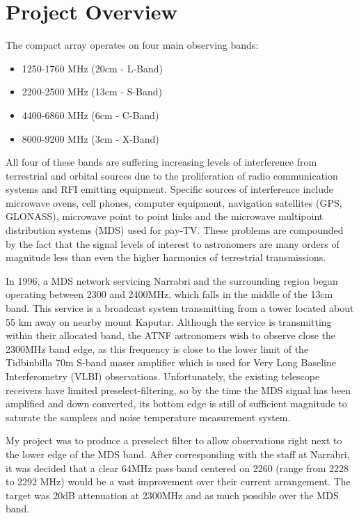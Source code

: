 \section{Project Overview}
The compact array operates on four main observing bands:

\begin{itemize}
\item	1250-1760 MHz (20cm - L-Band)
\item	2200-2500 MHz (13cm - S-Band)
\item	4400-6860 MHz (6cm  - C-Band)
\item	8000-9200 MHz (3cm  - X-Band)
\end{itemize}

All four of these bands are suffering increasing levels of interference from terrestrial and orbital sources due to the proliferation of radio communication systems and RFI emitting equipment. Specific sources of interference include microwave ovens, cell phones, computer equipment, navigation satellites (GPS, GLONASS), microwave point to point links and the microwave multipoint distribution systems (MDS) used for pay-TV. These problems are compounded by the fact that the signal levels of interest to astronomers are many orders of magnitude less than even the higher harmonics of terrestrial transmissions.

In 1996, a MDS network servicing Narrabri and the surrounding region began operating between 2300 and 2400MHz, which falls in the middle of the 13cm band. This service is a broadcast system transmitting from a tower located about 55 km away on nearby mount Kaputar. Although the service is transmitting within their allocated band, the ATNF astronomers wish to observe close the 2300MHz band edge, as this frequency is close to the lower limit of the Tidbinbilla 70m S-band maser amplifier which is used for Very Long Baseline Interferometry (VLBI) observations. Unfortunately, the existing telescope receivers have limited preselect-filtering, so by the time the MDS signal has been amplified and down converted, its bottom edge is still of sufficient magnitude to saturate the samplers and noise temperature measurement system.

My project was to produce a preselect filter to allow observations right next to the lower edge of the MDS band. After corresponding with the staff at Narrabri, it was decided that a clear 64MHz pass band centered on 2260 (range from 2228 to 2292 MHz) would be a vast improvement over their current arrangement. The target was 20dB attenuation at 2300MHz and as much possible over the MDS band.